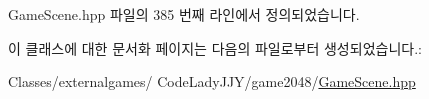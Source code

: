 Game\+Scene.\+hpp 파일의 385 번째 라인에서 정의되었습니다.



이 클래스에 대한 문서화 페이지는 다음의 파일로부터 생성되었습니다.\+:\begin{DoxyCompactItemize}
\item 
Classes/externalgames/ Code\+Lady\+J\+J\+Y/game2048/\hyperlink{_game_scene_8hpp}{Game\+Scene.\+hpp}\end{DoxyCompactItemize}
